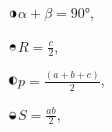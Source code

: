 \documentclass[a4paper]{article}
\begin{document}
\begin{multicols}{3}
\begin{center}
\includegraphics[width=0.02\textwidth]{круг3}$\alpha+\beta= 90°$,

\includegraphics[width=0.02\textwidth]{круг4}$R=\frac{c}{2}$,

\includegraphics[width=0.02\textwidth]{круг5}$p=\frac{(a+b+c)}{2}$,

\includegraphics[width=0.02\textwidth]{круг6}$S=\frac{ab}{2}$,


\end{center}
\end{multicols}
\end{document}
